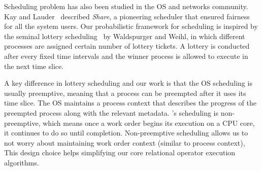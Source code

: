 
Scheduling problem has also been studied in the OS and networks community. 
Kay and Lauder~\cite{kay1988fair} described \textit{Share}, a pioneering scheduler that ensured fairness for all the system users.
Our probabilistic framework for scheduling is inspired by the seminal lottery scheduling~\cite{lottery-scheduling} by Waldspurger and Weihl,
in which different processes are assigned certain number of lottery tickets. 
A lottery is conducted after every fixed time intervals and the winner process is allowed to execute in the next time slice. 

A key difference in lottery scheduling and our work is that the OS scheduling is usually preemptive, meaning that a process can be preempted after it uses its time slice. 
The OS maintains a process context that describes the progress of the preempted process along with the relevant metadata. 
\sys{}'s scheduling is non-preemptive, which means once a work order begins its execution on a CPU core, it continues to do so until completion.
Non-preemptive scheduling allows us to not worry about maintaining work order context (similar to process context), 
This design choice helps simplifying our core relational operator execution algorithms.


